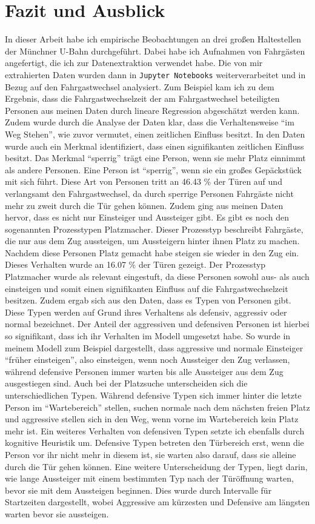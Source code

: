 \chapter{Fazit und Ausblick} \label{Fazit und Ausblick}
In dieser Arbeit habe ich empirische Beobachtungen an drei großen Haltestellen der Münchner U-Bahn durchgeführt. Dabei habe ich Aufnahmen von Fahrgästen angefertigt, die ich zur Datenextraktion verwendet habe. Die von mir extrahierten Daten wurden dann in \texttt{Jupyter Notebooks} weiterverarbeitet und in Bezug auf den Fahrgastwechsel analysiert. Zum Beispiel kam ich zu dem Ergebnis, dass die Fahrgastwechselzeit der am Fahrgastwechsel beteiligten Personen aus meinen Daten durch lineare Regression abgeschätzt werden kann. Zudem wurde durch die Analyse der Daten klar, dass die Verhaltensweise "`im Weg Stehen"', wie zuvor vermutet, einen zeitlichen Einfluss besitzt. In den Daten wurde auch ein Merkmal identifiziert, dass einen signifikanten zeitlichen Einfluss besitzt. Das Merkmal "`sperrig"' trägt eine Person, wenn sie mehr Platz einnimmt als andere Personen. Eine Person ist \zB "`sperrig"', wenn sie ein großes Gepäckstück mit sich führt. Diese Art von Personen tritt an 46.43 \% der Türen auf und verlangsamt den Fahrgastwechsel, da durch sperrige Personen Fahrgäste nicht mehr zu zweit durch die Tür gehen können. Zudem ging aus meinen Daten hervor, dass es nicht nur Einsteiger und Aussteiger gibt. Es gibt es noch den sogenannten Prozesstypen Platzmacher. Dieser Prozesstyp beschreibt Fahrgäste, die nur aus dem Zug aussteigen, um Aussteigern hinter ihnen Platz zu machen. Nachdem diese Personen Platz gemacht habe steigen sie wieder in den Zug ein. Dieses Verhalten wurde an 16.07 \% der Türen gezeigt. Der Prozesstyp Platzmacher wurde als relevant eingestuft, da diese Personen sowohl aus- als auch einsteigen und somit einen signifikanten Einfluss auf die Fahrgastwechselzeit besitzen. Zudem ergab sich aus den Daten, dass es Typen von Personen gibt. Diese Typen werden auf Grund ihres Verhaltens als defensiv, aggressiv oder normal bezeichnet. Der Anteil der aggressiven und defensiven Personen ist hierbei so signifikant, dass ich ihr Verhalten im Modell umgesetzt habe. So wurde in meinem Modell zum Beispiel dargestellt, dass aggressive und normale Einsteiger "`früher einsteigen"', also einsteigen, wenn noch Aussteiger den Zug verlassen, während defensive Personen immer warten bis alle Aussteiger aus dem Zug ausgestiegen sind. Auch bei der Platzsuche unterscheiden sich die unterschiedlichen Typen. Während defensive Typen sich immer hinter die letzte Person im "`Wartebereich"' stellen, suchen normale nach dem nächsten freien Platz und aggressive stellen sich in den Weg, wenn vorne im Wartebereich kein Platz mehr ist. Ein weiteres Verhalten von defensiven Typen setzte ich ebenfalls durch kognitive Heuristik um. Defensive Typen betreten den Türbereich erst, wenn die Person vor ihr nicht mehr in diesem ist, sie warten also darauf, dass sie alleine durch die Tür gehen können. Eine weitere Unterscheidung der Typen, liegt darin, wie lange Aussteiger mit einem bestimmten Typ nach der Türöffnung warten, bevor sie mit dem Aussteigen beginnen. Dies wurde durch Intervalle für Startzeiten dargestellt, wobei Aggressive am kürzesten und Defensive am längsten warten bevor sie aussteigen.

